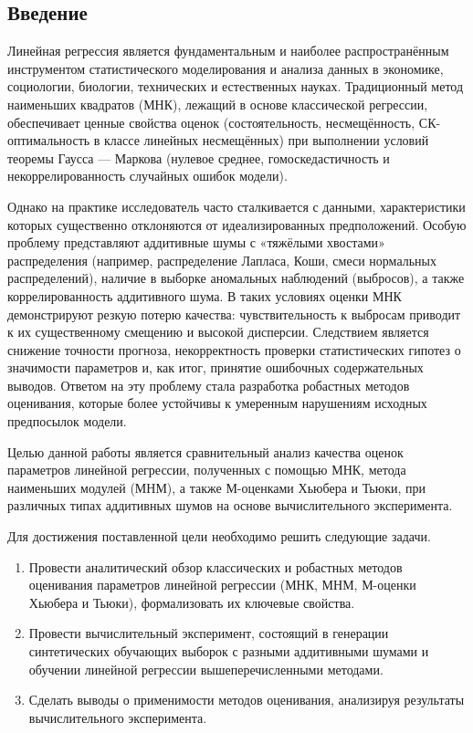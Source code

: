 \documentclass[12pt,a4paper]{article}
\begin{document}
	
	\setcounter{page}{3}
	
	\begin{center}
		\tableofcontents
	\end{center}
	
	\newpage
	\begin{center}
		\section*{Введение}
	\end{center}
	
	Линейная регрессия является фундаментальным и наиболее распространённым инструментом статистического моделирования и анализа данных в экономике, социологии, биологии, технических и естественных науках. Традиционный метод наименьших квадратов (МНК), лежащий в основе классической регрессии, обеспечивает ценные свойства оценок (состоятельность, несмещённость, СК-оптимальность в классе линейных несмещённых) при выполнении условий теоремы Гаусса --- Маркова (нулевое среднее, гомоскедастичность и некоррелированность случайных ошибок модели).
	
	Однако на практике исследователь часто сталкивается с данными, характеристики которых существенно отклоняются от идеализированных предположений. Особую проблему представляют аддитивные шумы с «тяжёлыми хвостами» распределения (например, распределение Лапласа, Коши, смеси нормальных распределений), наличие в выборке аномальных наблюдений (выбросов), а также коррелированность аддитивного шума. В таких условиях оценки МНК демонстрируют резкую потерю качества: чувствительность к выбросам приводит к их существенному смещению и высокой дисперсии. Следствием является снижение точности прогноза, некорректность проверки статистических гипотез о значимости параметров и, как итог, принятие ошибочных содержательных выводов. Ответом на эту проблему стала разработка робастных методов оценивания, которые более устойчивы к умеренным нарушениям исходных предпосылок модели.
	
	Целью данной работы является сравнительный анализ качества оценок параметров линейной регрессии, полученных с помощью МНК, метода наименьших модулей (МНМ), а также М-оценками Хьюбера и Тьюки, при различных типах аддитивных шумов на основе вычислительного эксперимента.
	
	Для достижения поставленной цели необходимо решить следующие задачи.
	\begin{enumerate}
		\item Провести аналитический обзор классических и робастных методов оценивания параметров линейной регрессии (МНК, МНМ, М-оценки Хьюбера и Тьюки), формализовать их ключевые свойства.
		\item Провести вычислительный эксперимент, состоящий в генерации синтетических обучающих выборок с разными аддитивными шумами и обучении линейной регрессии вышеперечисленными методами.
		\item Сделать выводы о применимости методов оценивания, анализируя результаты вычислительного эксперимента.
	\end{enumerate}
	
\end{document}
